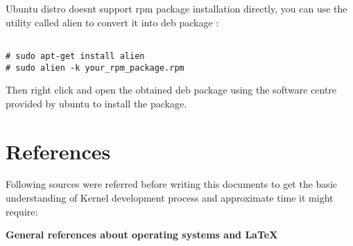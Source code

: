 \documentclass[11pt]{article}
\begin{document}
\vspace {3mm}

\noindent
Ubuntu distro doesnt support rpm package installation directly, you can use the utility called alien to convert it into deb package : 
\begin{lstlisting}

# sudo apt-get install alien
# sudo alien -k your_rpm_package.rpm

\end{lstlisting}

\vspace {3mm}

\noindent
Then right click and open the obtained deb package using the software centre provided by ubuntu to install the package.

\section{References}
 
 Following sources were referred before writing this documents to get the basic understanding of Kernel development process and approximate time it might require:
 
\vspace {5 mm}
 
\textbf{ General references about operating systems and LaTeX}
 
\end{document}
